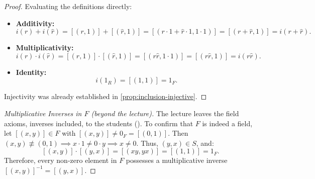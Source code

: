 \begin{content}
\begin{proof}
Evaluating the definitions directly:
\begin{itemize}
    \item \textbf{Additivity:}
    \[
    i(r) + i(\hat{r}) = [(r, 1)] + [(\hat{r}, 1)] = [(r \cdot 1 + \hat{r} \cdot 1, 1 \cdot 1)] = [(r + \hat{r}, 1)] = i(r + \hat{r}).
    \]
    \item \textbf{Multiplicativity:}
    \[
    i(r) \cdot i(\hat{r}) = [(r, 1)] \cdot [(\hat{r}, 1)] = [(r \hat{r}, 1 \cdot 1)] = [(r \hat{r}, 1)] = i(r \hat{r}).
    \]
    \item \textbf{Identity:}
    \[
    i(1_R) = [(1, 1)] = 1_F.
    \]
\end{itemize}
Injectivity was already established in \cref{prop:inclusion-injective}.
\end{proof}

\begin{proof}[Multiplicative Inverses in $F$ (beyond the lecture)]
The lecture leaves the field axioms, inverses included, to the students (). To confirm that $F$ is indeed a field, let $[(x, y)] \in F$ with $[(x, y)] \ne 0_F = [(0, 1)]$. Then $(x, y) \not\equiv (0, 1) \implies x \cdot 1 \ne 0 \cdot y \implies x \ne 0$. Thus, $(y, x) \in S$, and:
\[
[(x, y)] \cdot [(y, x)] = [(xy, yx)] = [(1, 1)] = 1_F.
\]
Therefore, every non-zero element in $F$ possesses a multiplicative inverse $[(x, y)]^{-1} = [(y, x)]$.
\end{proof}


\end{content}
